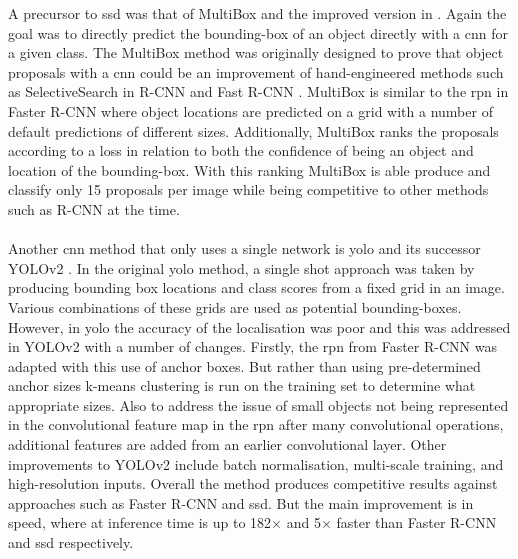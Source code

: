A precursor to \gls{ssd} was that of MultiBox \cite{multibox1} and the improved version in \cite{multibox2}. Again the goal was to directly predict the bounding-box of an object directly with a \gls{cnn} for a given class. The MultiBox method was originally designed to prove that object proposals with a \gls{cnn} could be an improvement of hand-engineered methods such as SelectiveSearch \cite{selectivesearch} in R-CNN \cite{rcnn} and Fast R-CNN \cite{fastrcnn}. MultiBox is similar to the \gls{rpn} in Faster R-CNN \cite{fasterrcnn} where object locations are predicted on a grid with a number of default predictions of different sizes. Additionally, MultiBox ranks the proposals according to a loss in relation to both the confidence of being an object and location of the bounding-box. With this ranking MultiBox is able produce and classify only 15 proposals per image while being competitive to other methods such as R-CNN at the time.
\\\\
Another \gls{cnn} method that only uses a single network is \gls{yolo} \cite{yolo} and its successor YOLOv2 \cite {yolov2}. In the original \gls{yolo} method, a single shot approach was taken by producing bounding box locations and class scores from a fixed grid in an image. Various combinations of these grids are used as potential bounding-boxes. However, in \gls{yolo} the accuracy of the localisation was poor and this was addressed in YOLOv2 with a number of changes. Firstly, the \gls{rpn} from Faster R-CNN \cite{fasterrcnn} was adapted with this use of anchor boxes. But rather than using pre-determined anchor sizes k-means clustering is run on the training set to determine what appropriate sizes. Also to address the issue of small objects not being represented in the convolutional feature map in the \gls{rpn} after many convolutional operations, additional features are added from an earlier convolutional layer. Other improvements to YOLOv2 include batch normalisation, multi-scale training, and high-resolution inputs. Overall the method produces competitive results against approaches such as Faster R-CNN and \gls{ssd}. But the main improvement is in speed, where at inference time is up to 182$\times$ and 5$\times$ faster than Faster R-CNN and \gls{ssd} respectively.
\\\\
